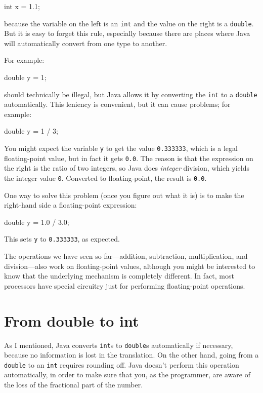 \begin{code}
    int x = 1.1;
\end{code}

because the variable on the left is an {\tt int} and the value on the right is a {\tt double}.
But it is easy to forget this rule, especially because there are places where Java will automatically convert from one type to another.

For example:

\begin{code}
    double y = 1;
\end{code}

should technically be illegal, but Java allows it by converting the {\tt int} to a {\tt double} automatically.
This leniency is convenient, but it can cause problems; for example:

\begin{code}
    double y = 1 / 3;
\end{code}

You might expect the variable {\tt y} to get the value {\tt 0.333333}, which is a legal floating-point value, but in fact it gets {\tt 0.0}.
The reason is that the expression on the right is the ratio of two integers, so Java does {\em integer} division, which yields the integer value {\tt 0}.
Converted to floating-point, the result is {\tt 0.0}.

One way to solve this problem (once you figure out what it is) is to make the right-hand side a floating-point expression:

\begin{code}
    double y = 1.0 / 3.0;
\end{code}

This sets {\tt y} to {\tt 0.333333}, as expected.


The operations we have seen so far---addition, subtraction, multiplication, and division---also work on floating-point values, although you might be interested to know that the underlying mechanism is completely different.
In fact, most processors have special circuitry just for performing floating-point operations.


\section{From double to int}
\label{rounding}

As I mentioned, Java converts {\tt int}s to {\tt double}s automatically if necessary, because no information is lost in the translation.
On the other hand, going from a {\tt double} to an {\tt int} requires rounding off.
Java doesn't perform this operation automatically, in order to make sure that you, as the programmer, are aware of the loss of the fractional part of the number.

